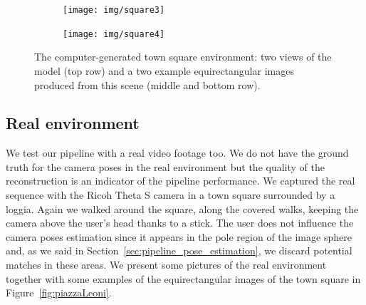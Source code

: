 \begin{figure}
\begin{subfigure}{0.4\textwidth}
	\end{subfigure}
	\begin{subfigure}{0.8\textwidth}
		\centering
		\texttt{[image: img/square3]}
	\end{subfigure}
	\begin{subfigure}{0.8\textwidth}
		\centering
		\texttt{[image: img/square4]}
	\end{subfigure}
	\caption{The computer-generated town square environment: two views of the
	model (top row) and a two example equirectangular images produced from this
	scene (middle and bottom row).}
    \label{fig:test_square}
\end{figure}

\subsection{Real environment}\label{subsec:real_environment}
We test our pipeline with a real video footage too. We do not have the ground truth
for the camera poses in the real environment but the quality of the
reconstruction is an indicator of the pipeline performance.
We captured the real sequence with the Ricoh Theta S camera in a town square
surrounded by a loggia. Again we walked around the square, along the covered
walks, keeping the camera above the user's head thanks to a stick.
The user does not influence the camera poses estimation since it appears in the
pole region of the image sphere and, as we said in
Section~\ref{sec:pipeline_pose_estimation}, we discard potential matches in
these areas.
We present some pictures of the real environment together with some examples
of the equirectangular images of the town square in
Figure~\ref{fig:piazzaLeoni}.
%
